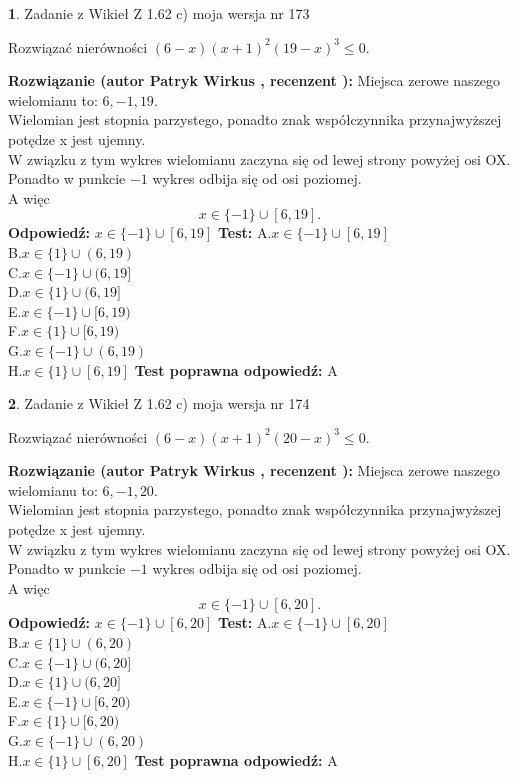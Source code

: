 \documentclass[12pt, a4paper]{article}
\theoremstyle{definition} %
\newtheorem{zad}{}
\newcommand{\zadStart}[1]{\begin{zad}#1\newline}
\newcommand{\zadStop}{\end{zad}}
\newcommand{\rozwStart}[2]{\noindent \textbf{Rozwiązanie (autor #1 , recenzent #2): }\newline}
\newcommand{\rozwStop}{\newline}
\newcommand{\odpStart}{\noindent \textbf{Odpowiedź:}\newline}
\newcommand{\odpStop}{\newline}
\newcommand{\testStart}{\noindent \textbf{Test:}\newline}
\newcommand{\testStop}{\newline}
\newcommand{\kluczStart}{\noindent \textbf{Test poprawna odpowiedź:}\newline}
\newcommand{\kluczStop}{\newline}
\begin{document}
\zadStart{Zadanie z Wikieł Z 1.62 c) moja wersja nr 173}

Rozwiązać nierówności $(6-x)(x+1)^{2}(19-x)^{3}\le0$.
\zadStop
\rozwStart{Patryk Wirkus}{}
Miejsca zerowe naszego wielomianu to: $6, -1, 19$.\\
Wielomian jest stopnia parzystego, ponadto znak współczynnika przy\linebreak najwyższej potędze x jest ujemny.\\ W związku z tym wykres wielomianu zaczyna się od lewej strony powyżej osi OX.\\
Ponadto w punkcie $-1$ wykres odbija się od osi poziomej.\\
A więc $$x \in \{-1\} \cup [6,19].$$
\rozwStop
\odpStart
$x \in \{-1\} \cup [6,19]$
\odpStop
\testStart
A.$x \in \{-1\} \cup [6,19]$\\
B.$x \in \{1\} \cup (6,19)$\\
C.$x \in \{-1\} \cup (6,19]$\\
D.$x \in \{1\} \cup (6,19]$\\
E.$x \in \{-1\} \cup [6,19)$\\
F.$x \in \{1\} \cup [6,19)$\\
G.$x \in \{-1\} \cup (6,19)$\\
H.$x \in \{1\} \cup [6,19]$
\testStop
\kluczStart
A
\kluczStop



\zadStart{Zadanie z Wikieł Z 1.62 c) moja wersja nr 174}

Rozwiązać nierówności $(6-x)(x+1)^{2}(20-x)^{3}\le0$.
\zadStop
\rozwStart{Patryk Wirkus}{}
Miejsca zerowe naszego wielomianu to: $6, -1, 20$.\\
Wielomian jest stopnia parzystego, ponadto znak współczynnika przy\linebreak najwyższej potędze x jest ujemny.\\ W związku z tym wykres wielomianu zaczyna się od lewej strony powyżej osi OX.\\
Ponadto w punkcie $-1$ wykres odbija się od osi poziomej.\\
A więc $$x \in \{-1\} \cup [6,20].$$
\rozwStop
\odpStart
$x \in \{-1\} \cup [6,20]$
\odpStop
\testStart
A.$x \in \{-1\} \cup [6,20]$\\
B.$x \in \{1\} \cup (6,20)$\\
C.$x \in \{-1\} \cup (6,20]$\\
D.$x \in \{1\} \cup (6,20]$\\
E.$x \in \{-1\} \cup [6,20)$\\
F.$x \in \{1\} \cup [6,20)$\\
G.$x \in \{-1\} \cup (6,20)$\\
H.$x \in \{1\} \cup [6,20]$
\testStop
\kluczStart
A
\kluczStop
\end{document}
